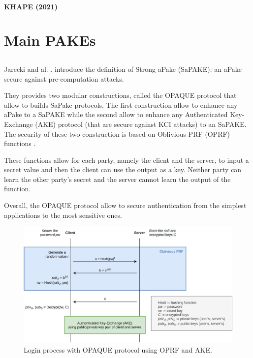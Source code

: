 \documentclass[../report.tex]{subfiles}
\begin{document}
\paragraph{KHAPE (2021)}





\section{Main PAKEs}

\subsection{}


\paragraph{}
Jarecki and al. \cite{}. introduce the definition of Strong aPake (SaPAKE): an aPake secure against pre-computation attacks.

They provides two modular constructions, called the OPAQUE protocol that allow to builds SaPake protocols. The first construction allow to enhance any aPake to a SaPAKE while the second allow to enhance any Authenticated Key-Exchange (AKE) protocol (that are secure against KCI attacks) to an SaPAKE.
The security of these two construction is based on Oblivious PRF (OPRF) functions \cite{}.

These functions allow for each party, namely the client and the server, to input a secret value and then the client can use the output as a key. Neither party can learn the other party's secret and the server cannot learn the output of the function.

Overall, the OPAQUE protocol allow to secure authentication from the simplest applications to the most sensitive ones.


\begin{figure}[h]
 \centering
 \includegraphics[width=\textwidth]{OPAQUE.png}
 \caption{Login process with OPAQUE protocol using OPRF and AKE.}
 \label{fig:OPAQUE_AKE}
\end{figure}
\end{document}

